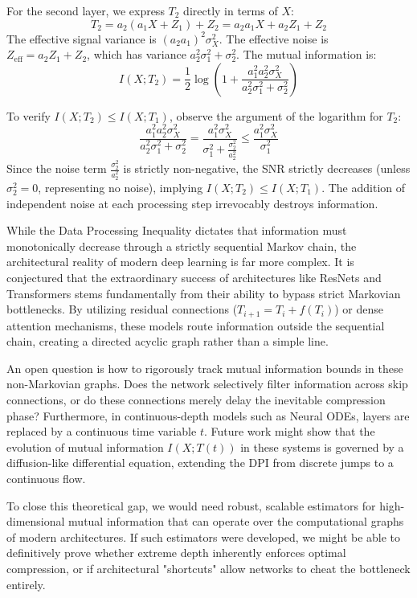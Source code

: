 For the second layer, we express $T_2$ directly in terms of $X$:
\[ T_2 = a_2 (a_1 X + Z_1) + Z_2 = a_2 a_1 X + a_2 Z_1 + Z_2 \]
The effective signal variance is $(a_2 a_1)^2 \sigma_X^2$.
The effective noise is $Z_{\text{eff}} = a_2 Z_1 + Z_2$, which has variance $a_2^2 \sigma_1^2 + \sigma_2^2$.
The mutual information is:
\[ I(X; T_2) = \frac{1}{2} \log\left( 1 + \frac{a_1^2 a_2^2 \sigma_X^2}{a_2^2 \sigma_1^2 + \sigma_2^2} \right) \]

To verify $I(X; T_2) \le I(X; T_1)$, observe the argument of the logarithm for $T_2$:
\[ \frac{a_1^2 a_2^2 \sigma_X^2}{a_2^2 \sigma_1^2 + \sigma_2^2} = \frac{a_1^2 \sigma_X^2}{\sigma_1^2 + \frac{\sigma_2^2}{a_2^2}} \le \frac{a_1^2 \sigma_X^2}{\sigma_1^2} \]
Since the noise term $\frac{\sigma_2^2}{a_2^2}$ is strictly non-negative, the SNR strictly decreases (unless $\sigma_2^2 = 0$, representing no noise), implying $I(X; T_2) \le I(X; T_1)$. The addition of independent noise at each processing step irrevocably destroys information.

\begin{horizon}
While the Data Processing Inequality dictates that information must monotonically decrease through a strictly sequential Markov chain, the architectural reality of modern deep learning is far more complex. It is conjectured that the extraordinary success of architectures like ResNets and Transformers stems fundamentally from their ability to bypass strict Markovian bottlenecks. By utilizing residual connections ($T_{i+1} = T_i + f(T_i)$) or dense attention mechanisms, these models route information outside the sequential chain, creating a directed acyclic graph rather than a simple line. 

An open question is how to rigorously track mutual information bounds in these non-Markovian graphs. Does the network selectively filter information across skip connections, or do these connections merely delay the inevitable compression phase? Furthermore, in continuous-depth models such as Neural ODEs, layers are replaced by a continuous time variable $t$. Future work might show that the evolution of mutual information $I(X; T(t))$ in these systems is governed by a diffusion-like differential equation, extending the DPI from discrete jumps to a continuous flow. 

To close this theoretical gap, we would need robust, scalable estimators for high-dimensional mutual information that can operate over the computational graphs of modern architectures. If such estimators were developed, we might be able to definitively prove whether extreme depth inherently enforces optimal compression, or if architectural "shortcuts" allow networks to cheat the bottleneck entirely.
\end{horizon}

